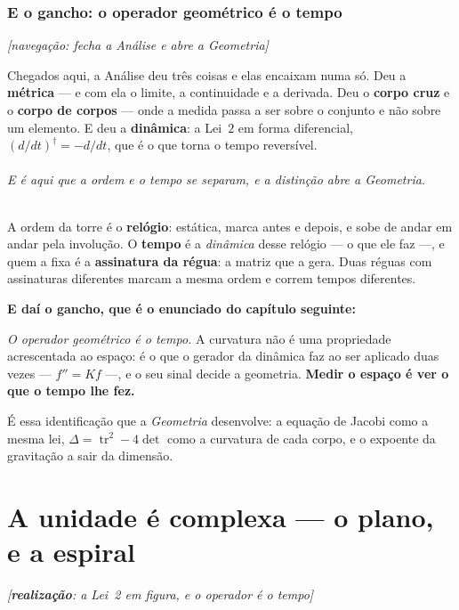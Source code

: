\documentclass[livro.tex]{subfiles}
\begin{document}
\section{E o gancho: o operador geométrico é o tempo}\label{sec:gancho}
\hfill \emph{\small[navegação: fecha a Análise e abre a Geometria]}

Chegados aqui, a Análise deu três coisas e elas encaixam numa só. Deu a \textbf{métrica} --- e com
ela o limite, a continuidade e a derivada. Deu o \textbf{corpo cruz} e o \textbf{corpo de corpos}
--- onde a medida passa a ser sobre o conjunto e não sobre um elemento. E deu a \textbf{dinâmica}:
a Lei~$2$ em forma diferencial, $(d/dt)^{\dagger}=-d/dt$, que é o que torna o tempo reversível.

\paragraph{E é aqui que a ordem e o tempo se separam, e a distinção abre a Geometria.} A ordem da
torre é o \textbf{relógio}: estática, marca antes e depois, e sobe de andar em andar pela involução.
O \textbf{tempo} é a \emph{dinâmica} desse relógio --- o que ele faz ---, e quem a fixa é a
\textbf{assinatura da régua}: a matriz que a gera. Duas réguas com assinaturas diferentes marcam a
mesma ordem e correm tempos diferentes.

\medskip
\noindent \textbf{E daí o gancho, que é o enunciado do capítulo seguinte:}

\begin{center}\small
\begin{minipage}{0.9\textwidth}
\emph{O operador geométrico é o tempo.} A curvatura não é uma propriedade acrescentada ao espaço:
é o que o gerador da dinâmica faz ao ser aplicado duas vezes --- $f''=K f$ ---, e o seu sinal
decide a geometria. \textbf{Medir o espaço é ver o que o tempo lhe fez.}
\end{minipage}
\end{center}

\noindent É essa identificação que a \emph{Geometria} desenvolve: a equação de Jacobi como a mesma
lei, $\Delta=\operatorname{tr}^{2}-4\det$ como a curvatura de cada corpo, e o expoente da gravitação
a sair da dimensão.

\part{A unidade é complexa --- o plano, e a espiral}
\noindent\hfill\emph{\small[\textbf{realização}: a Lei~2 em figura, e o operador é o tempo]}\medskip
\end{document}
